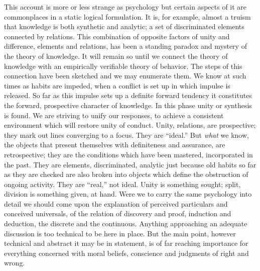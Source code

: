 \documentclass[12pt]{article}
\begin{document}
This account is more or less strange as psychology
but certain aspects of it are commonplaces in a static
logical formulation. It is, for example, almost a truism
that knowledge is both synthetic and analytic; a set of
discriminated elements connected by relations. This
combination of opposite factors of unity and difference,
elements and relations, has been a standing paradox and
mystery of the theory of knowledge. It will remain so
until we connect the theory of knowledge with an empirically
verifiable theory of behavior. The steps of
this connection have been sketched and we may enumerate
them. We know at such times as habits are
impeded, when a conflict is set up in which impulse is
released. So far as this impulse sets up a definite forward
tendency it constitutes the forward, prospective
character of knowledge. In this phase unity or synthesis
is found. We are striving to unify our responses,
to achieve a consistent environment which will restore
unity of conduct. Unity, relations, are prospective;
they mark out lines converging to a focus. They are
``ideal.'' But \emph{what} we know, the objects that present
themselves with definiteness and assurance, are retrospective;
they are the conditions which have been mastered,
incorporated in the past. They are elements,
discriminated, analytic just because old habits so far
as they are checked are also broken into objects which
define the obstruction of ongoing activity. They are
``real,'' not ideal. Unity is something sought; split,
division is something given, at hand. Were we to carry
the same psychology into detail we should come upon
the explanation of perceived particulars and conceived
universals, of the relation of discovery and proof, induction
and deduction, the discrete and the continuous.
Anything approaching an adequate discussion is too
technical to be here in place. But the main point,
however technical and abstract it may be in statement,
is of far reaching importance for everything concerned
with moral beliefs, conscience and judgments of right
and wrong.
\end{document}
